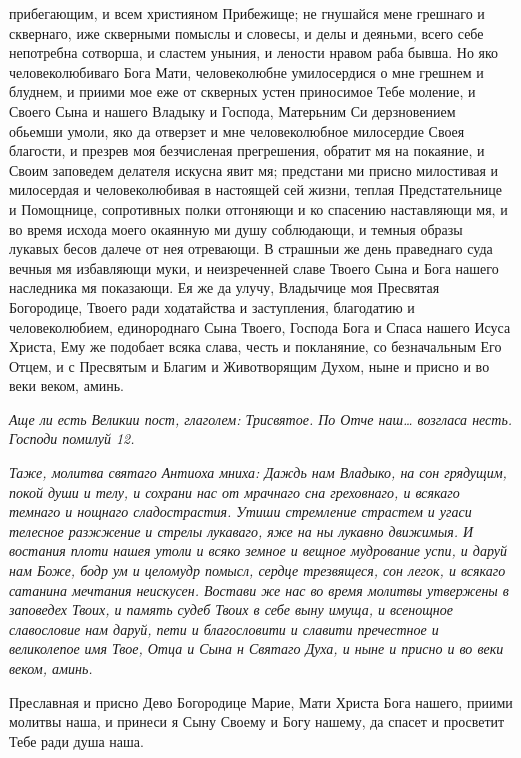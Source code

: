 прибегающим, и всем християном Прибежище; не гнушайся мене грешнаго и
сквернаго, иже скверными помыслы и словесы, и делы и деяньми, всего себе
непотребна сотворша, и сластем уныния, и лености нравом раба бывша. Но
яко человеколюбиваго Бога Мати, человеколюбне умилосердися о мне
грешнем и блуднем, и приими мое еже от скверных устен приносимое Тебе
моление, и Своего Сына и нашего Владыку и Господа, Матерьним Си
дерзновением обьемши умоли, яко да отверзет и мне человеколюбное
милосердие Своея благости, и презрев моя безчисленая прегрешения,
обратит мя на покаяние, и Своим заповедем делателя искусна явит мя;
предстани ми присно милостивая и милосердая и человеколюбивая в
настоящей сей жизни, теплая Предстательнице и Помощнице, сопротивных
полки отгоняющи и ко спасению наставляющи мя, и во время исхода
моего окаянную ми душу соблюдающи, и темныя образы лукавых
бесов далече от нея отревающи. В страшныи же день праведнаго суда
вечныя мя избавляющи муки, и неизреченней славе Твоего Сына и
Бога нашего наследника мя показающи. Ея же да улучу, Владычице
моя Пресвятая Богородице, Твоего ради ходатайства и заступления,
благодатию и человеколюбием, единороднаго Сына Твоего, Господа
Бога и Спаса нашего Исуса Христа, Ему же подобает всяка слава,
честь и покланяние, со безначальным Его Отцем, и с Пресвятым и
Благим и Животворящим Духом, ныне и присно и во веки веком,
аминь.


 \itshape Аще ли есть Великии пост, глаголем:\normalfont{} \itshape Трисвятое\normalfont{}. \itshape По\normalfont{} Отче наш… \itshape возгласа
несть.\normalfont{} Господи помилуй \itshape 12\normalfont{}.


 \itshape Таже, молитва святаго Антиоха мниха:\normalfont{} Даждь нам Владыко, на сон
грядущим, покой души и телу, и сохрани нас от мрачнаго сна греховнаго, и
всякаго темнаго и нощнаго сладострастия. Утиши стремление страстем и
угаси телесное разжжение и стрелы лукаваго, яже на ны лукавно
движимыя. И востания плоти нашея утоли и всяко земное и вещное
мудрование успи, и даруй нам Боже, бодр ум и целомудр помысл,
сердце трезвящеся, сон легок, и всякаго сатанина мечтания неискусен.
Востави же нас во время молитвы утвержены в заповедех Твоих, и
память судеб Твоих в себе выну имуща, и всенощное славословие нам
даруй, пети и благословити и славити пречестное и великолепое имя
Твое, Отца и Сына н Святаго Духа, и ныне и присно и во веки веком,
аминь.


   Преславная и присно Дево Богородице Марие, Мати Христа Бога нашего,
приими молитвы наша, и принеси я Сыну Своему и Богу нашему, да спасет и
просветит Тебе ради душа наша.


